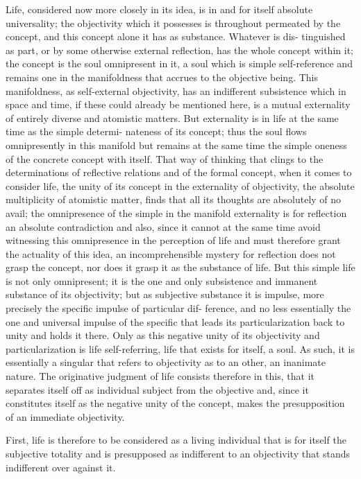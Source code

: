 Life, considered now more closely in its idea, is in and for itself absolute
universality; the objectivity which it possesses is throughout permeated by
the concept, and this concept alone it has as substance. Whatever is dis-
tinguished as part, or by some otherwise external reflection, has the whole
concept within it; the concept is the soul omnipresent in it, a soul which is
simple self-reference and remains one in the manifoldness that accrues to
the objective being. This manifoldness, as self-external objectivity, has an
indifferent subsistence which in space and time, if these could already be
mentioned here, is a mutual externality of entirely diverse and atomistic
matters. But externality is in life at the same time as the simple determi-
nateness of its concept; thus the soul flows omnipresently in this manifold
but remains at the same time the simple oneness of the concrete concept
with itself.
 That way of thinking that clings to the determinations of
reflective relations and of the formal concept, when it comes to consider
life, the unity of its concept in the externality of objectivity, the absolute
multiplicity of atomistic matter, finds that all its thoughts are absolutely of
no avail; the omnipresence of the simple in the manifold externality is for
reflection an absolute contradiction and also, since it cannot at the same
time avoid witnessing this omnipresence in the perception of life and must
therefore grant the actuality of this idea, an incomprehensible mystery
 for
reflection does not grasp the concept, nor does it grasp it as the substance
of life.
 But this simple life is not only omnipresent; it is the one and
only subsistence and immanent substance of its objectivity; but as subjective
substance it is impulse, more precisely the specific impulse of particular dif-
ference, and no less essentially the one and universal impulse of the specific
that leads its particularization back to unity and holds it there. Only as this
negative unity of its objectivity and particularization is life self-referring, life
that exists for itself, a soul. As such, it is essentially a singular that refers to
objectivity as to an other, an inanimate nature. The originative judgment of
life consists therefore in this, that it separates itself off as individual subject
from the objective and, since it constitutes itself as the negative unity of
the concept, makes the presupposition of an immediate objectivity.

First, life is therefore to be considered as a living individual that is for itself
the subjective totality and is presupposed as indifferent to an objectivity
that stands indifferent over against it.

